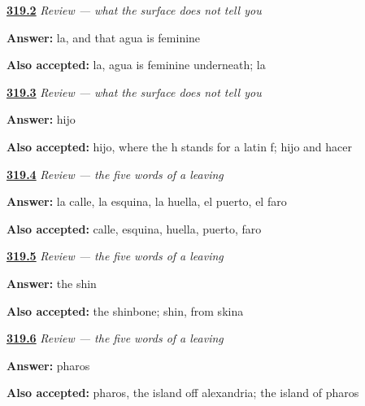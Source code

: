 \noindent\begin{minipage}[t]{\linewidth}
\raggedright
\hyperlink{review-ES-C319-repaso-la-superficie-pronoun}{\textbf{319.2}} \emph{Review — what the surface does not tell you}\par
\small \textbf{Answer:} la, and that agua is feminine\par
\footnotesize \textbf{Also accepted:} la, agua is feminine underneath; la
\end{minipage}\par\medskip

\noindent\begin{minipage}[t]{\linewidth}
\raggedright
\hyperlink{review-ES-C319-repaso-la-superficie-hache}{\textbf{319.3}} \emph{Review — what the surface does not tell you}\par
\small \textbf{Answer:} hijo\par
\footnotesize \textbf{Also accepted:} hijo, where the h stands for a latin f; hijo and hacer
\end{minipage}\par\medskip

\noindent\begin{minipage}[t]{\linewidth}
\raggedright
\hyperlink{review-ES-C319-repaso-salir-order}{\textbf{319.4}} \emph{Review — the five words of a leaving}\par
\small \textbf{Answer:} la calle, la esquina, la huella, el puerto, el faro\par
\footnotesize \textbf{Also accepted:} calle, esquina, huella, puerto, faro
\end{minipage}\par\medskip

\noindent\begin{minipage}[t]{\linewidth}
\raggedright
\hyperlink{review-ES-C319-repaso-salir-shin}{\textbf{319.5}} \emph{Review — the five words of a leaving}\par
\small \textbf{Answer:} the shin\par
\footnotesize \textbf{Also accepted:} the shinbone; shin, from skina
\end{minipage}\par\medskip

\noindent\begin{minipage}[t]{\linewidth}
\raggedright
\hyperlink{review-ES-C319-repaso-salir-island}{\textbf{319.6}} \emph{Review — the five words of a leaving}\par
\small \textbf{Answer:} pharos\par
\footnotesize \textbf{Also accepted:} pharos, the island off alexandria; the island of pharos
\end{minipage}\par\medskip

